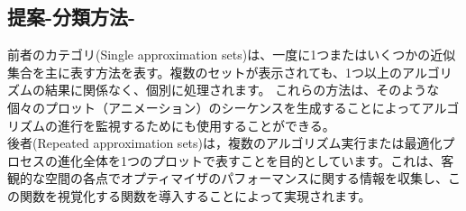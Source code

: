 \documentclass[autodetect-engine,dvipdfmx-if-dvi,ja=standard,a4paper,12pt]{bxjsarticle}
\begin{document}
\begin{multicols}{2}
      \section{提案-分類方法-}
      前者のカテゴリ(Single approximation sets)は、一度に1つまたはいくつかの近似集合を主に表す方法を表す。複数のセットが表示されても、1つ以上のアルゴリズムの結果に関係なく、個別に処理されます。 これらの方法は、そのような個々のプロット（アニメーション）のシーケンスを生成することによってアルゴリズムの進行を監視するためにも使用することができる。\\
      後者(Repeated approximation sets)は，複数のアルゴリズム実行または最適化プロセスの進化全体を1つのプロットで表すことを目的としています。これは、客観的な空間の各点でオプティマイザのパフォーマンスに関する情報を収集し、この関数を視覚化する関数を導入することによって実現されます。



    \end{multicols}   
    
\end{document}
